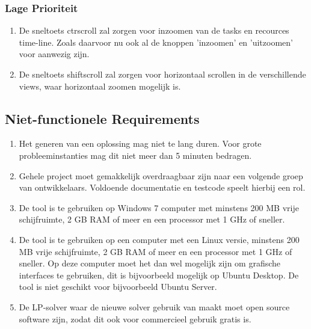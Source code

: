 \subsubsection*{Lage Prioriteit}
\begin{enumerate}[resume]
    \item De sneltoets ctr\plus  scroll zal zorgen voor inzoomen van de tasks en recources time-line. Zoals daarvoor nu ook al de knoppen 'inzoomen' en 'uitzoomen' voor aanwezig zijn. 
    \item De sneltoets shift\plus scroll zal zorgen voor horizontaal scrollen in de verschillende views, waar horizontaal zoomen mogelijk is.
\end{enumerate}

\subsection{Niet-functionele Requirements}
\begin{enumerate}
    \item Het generen van een oplossing mag niet te lang duren. Voor grote probleeminstanties mag dit niet meer dan 5 minuten bedragen.
    \item Gehele project moet gemakkelijk overdraagbaar zijn naar een volgende groep van ontwikkelaars. Voldoende documentatie en testcode speelt hierbij een rol.
    \item De tool is te gebruiken op Windows 7 computer met minstens 200 MB vrije schijfruimte, 2 GB RAM of meer en een processor met 1 GHz of sneller.
    \item De tool is te gebruiken op een computer met een Linux versie, minstens 200 MB vrije schijfruimte, 2 GB RAM of meer en een processor met 1 GHz of sneller. Op deze computer moet het dan wel mogelijk zijn om grafische interfaces te gebruiken, dit is bijvoorbeeld mogelijk op Ubuntu Desktop. De tool is niet geschikt voor bijvoorbeeld Ubuntu Server. 
    \item De LP-solver waar de nieuwe solver gebruik van maakt moet open source software zijn, zodat dit ook voor commercieel gebruik gratis is. 
\end{enumerate}
